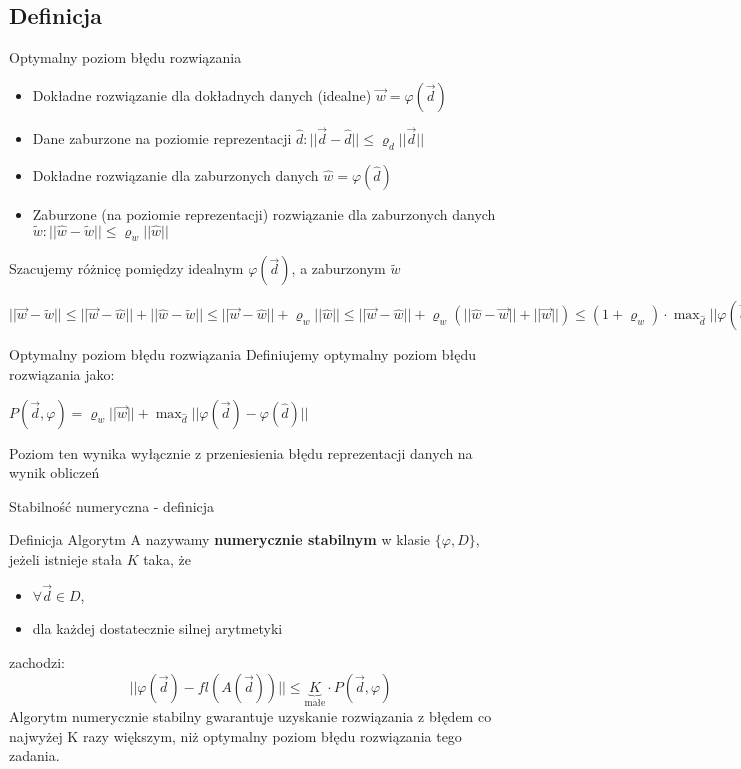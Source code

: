 \subsection{Definicja}
\begin{frame}{Optymalny poziom błędu rozwiązania}
    \begin{itemize}
        \item Dokładne rozwiązanie dla dokładnych danych (idealne) 	$ \vec{w} = \varphi(\vec{d}) $
        \item Dane zaburzone na poziomie reprezentacji  $\hat{d}: ||\vec{d} - \hat{d}|| \le \varrho_d ||\vec{d} || $ 
        \item Dokładne rozwiązanie dla zaburzonych danych $\hat{w} = \varphi(\hat{d})$
      \item Zaburzone (na poziomie reprezentacji) rozwiązanie dla zaburzonych danych	$\tilde{w}: ||\hat{w} - \tilde{w} || \le \varrho_w ||\hat{w}||$
    \end{itemize}
   Szacujemy różnicę pomiędzy  idealnym $\varphi(\vec{d})$, a zaburzonym $\tilde{w}$     
  \begin{center}
      $|| \vec{w} - \tilde{w} || \le ||\vec{w} - \hat{w}|| + ||\hat{w} - \tilde{w}|| \le
        	||\vec{w} - \hat{w}|| +\varrho_w ||\hat{w}||
        	\le
        	||\vec{w} - \hat{w}|| +\varrho_w (||\hat{w}-\vec{w}||+||\vec{w}||)
        	\le
        	(1 + \varrho_w) \cdot \max_{\hat{d}} ||\varphi(\vec{d}) - \varphi(\hat{d})|| + \varrho_w ||\vec{w}|| $
  \end{center}     
\end{frame}
\begin{frame}{Optymalny poziom błędu rozwiązania}
Definiujemy optymalny poziom błędu rozwiązania jako:
\begin{center}
    $ P(\vec{d}, \varphi) = \varrho_w ||\vec{w}|| + \max_{\hat{d}} ||\varphi(\vec{d}) - \varphi(\hat{d})||$
\end{center}

Poziom ten wynika wyłącznie  z przeniesienia błędu  reprezentacji  danych  na  wynik  obliczeń
\end{frame}
\begin{frame}{Stabilność numeryczna - definicja}
	\begin{block}{Definicja}
		Algorytm A nazywamy {\bf numerycznie stabilnym} w klasie $\{\varphi, D\}$, jeżeli istnieje stała $K$ taka, że 
        \begin{itemize}
        	\item $\forall \vec{d} \in D$,
            \item dla każdej dostatecznie silnej arytmetyki
        \end{itemize}
        zachodzi:
        \[
        	||\varphi(\vec{d}) - fl(A(\vec{d}))|| \le \underbrace{K}_\text{małe} \cdot P(\vec{d}, \varphi)
        \]
       Algorytm numerycznie stabilny gwarantuje uzyskanie  rozwiązania  z błędem co najwyżej
K razy większym, niż optymalny poziom błędu rozwiązania tego zadania.
	\end{block}
\end{frame}